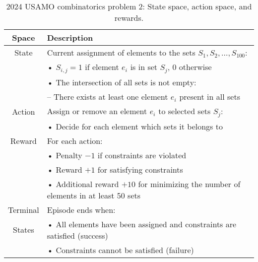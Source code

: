 \begin{table}[htb]
\caption{2024 USAMO combinatorics problem 2: State space, action space, and rewards.}
  \centering
  \small
\begin{tabular}{cl}
  \toprule
  Space    & Description \\
  \midrule
  State    & Current assignment of elements to the sets \( S_1, S_2, \ldots, S_{100} \): \\
           & • \( S_{i,j} = 1 \) if element \( e_i \) is in set \( S_j \), \( 0 \) otherwise \\
           & • The intersection of all sets is not empty: \\
           &   – There exists at least one element \( e_i \) present in all sets \\
  Action   & Assign or remove an element \( e_i \) to selected sets \( S_j \): \\
           & • Decide for each element which sets it belongs to \\
  Reward   & For each action: \\
           & • Penalty \( -1 \) if constraints are violated \\
           & • Reward \( +1 \) for satisfying constraints \\
           & • Additional reward \( +10 \) for minimizing the number of elements in at least 50 sets \\
  Terminal & Episode ends when: \\
  States   & • All elements have been assigned and constraints are satisfied (success) \\
           & • Constraints cannot be satisfied (failure) \\
  \bottomrule
\end{tabular}
\end{table}


